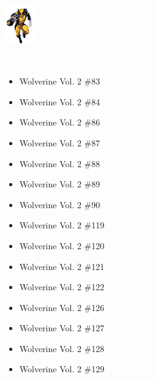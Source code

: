 \documentclass[12pt]{article}
\newcommand{\checkbox}{\raisebox{0.0ex}{\fbox{\rule{0ex}{1.5ex} \rule{1.5ex}{0ex}}}}
\begin{document}
\newpage
{}
\begin{center}
    \vspace*{2cm}
    \includegraphics[width=0.1\textwidth]{wolverine.png}
    \vspace{0.3cm}

    {\Huge \textbf{\textcolor{white}{Wolverine Chronological Checklist}}}
\end{center}
\vspace{0.3cm}
\noindent
\begin{tcolorbox}[
  colback=white!95!gray, colframe=black,
  width=\textwidth, arc=4mm, auto outer arc,
  boxrule=0.8pt,
  left=8pt,right=8pt,top=8pt,bottom=8pt
]
\begin{itemize}[left=0pt,label={\checkbox}]
  \item Wolverine Vol. 2 \#83
  \item Wolverine Vol. 2 \#84
  \item Wolverine Vol. 2 \#86
  \item Wolverine Vol. 2 \#87
  \item Wolverine Vol. 2 \#88
  \item Wolverine Vol. 2 \#89
  \item Wolverine Vol. 2 \#90
  \item Wolverine Vol. 2 \#119
  \item Wolverine Vol. 2 \#120
  \item Wolverine Vol. 2 \#121
  \item Wolverine Vol. 2 \#122
  \item Wolverine Vol. 2 \#126
  \item Wolverine Vol. 2 \#127
  \item Wolverine Vol. 2 \#128
  \item Wolverine Vol. 2 \#129
\end{itemize}
\end{tcolorbox}
\end{document}
